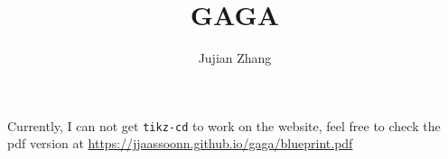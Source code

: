 \documentclass{report}
\title{GAGA}
\author{Jujian Zhang}
\begin{document}
\maketitle
Currently, I can not get {\tt tikz-cd} to work on the website, feel free to check the pdf version at \url{https://jjaassoonn.github.io/gaga/blueprint.pdf}

\end{document}
